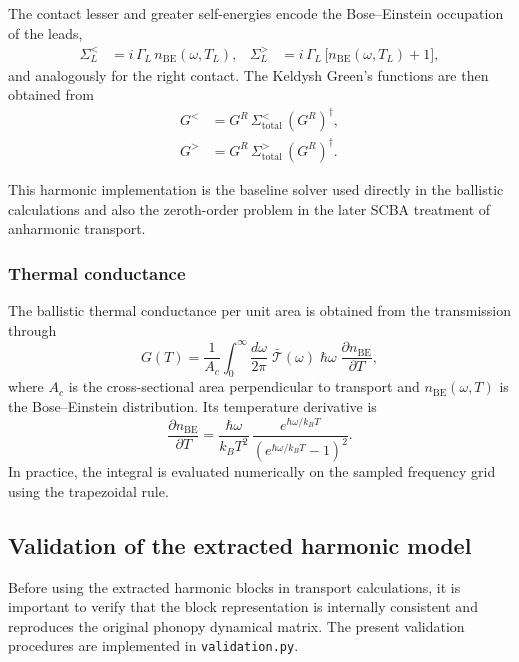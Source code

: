 The contact lesser and greater self-energies encode the Bose--Einstein
occupation of the leads,
\begin{align}
  \Sigma_L^< &= i\,\Gamma_L\,n_\mathrm{BE}(\omega,T_L), &
  \Sigma_L^> &= i\,\Gamma_L\,\bigl[n_\mathrm{BE}(\omega,T_L)+1\bigr],
\end{align}
and analogously for the right contact.  The Keldysh Green's functions
are then obtained from
\begin{align}
  G^< &= G^R\,\Sigma_\mathrm{total}^<\,(G^R)^\dagger, \\
  G^> &= G^R\,\Sigma_\mathrm{total}^>\,(G^R)^\dagger.
\end{align}

This harmonic implementation is the baseline solver used directly in the
ballistic calculations and also the zeroth-order problem in the later
SCBA treatment of anharmonic transport.

\subsubsection{Thermal conductance}

The ballistic thermal conductance per unit area is obtained from the
transmission through
\begin{equation}\label{eq:G_thermal}
  G(T)
  = \frac{1}{A_c}
    \int_0^\infty \frac{d\omega}{2\pi}\;
    \bar{\mathcal{T}}(\omega)\;
    \hbar\omega\;
    \frac{\partial n_\mathrm{BE}}{\partial T},
\end{equation}
where $A_c$ is the cross-sectional area perpendicular to transport and
$n_\mathrm{BE}(\omega,T)$ is the Bose--Einstein distribution.  Its
temperature derivative is
\begin{equation}
  \frac{\partial n_\mathrm{BE}}{\partial T}
  = \frac{\hbar\omega}{k_B T^2}\,
    \frac{e^{\hbar\omega/k_B T}}
         {(e^{\hbar\omega/k_B T}-1)^2}.
\end{equation}
In practice, the integral is evaluated numerically on the sampled
frequency grid using the trapezoidal rule.

\subsection{Validation of the extracted harmonic model}
\label{sec:extraction_validation}

Before using the extracted harmonic blocks in transport calculations, it
is important to verify that the block representation is internally
consistent and reproduces the original phonopy dynamical matrix.  The
present validation procedures are implemented in
\texttt{validation.py}.

